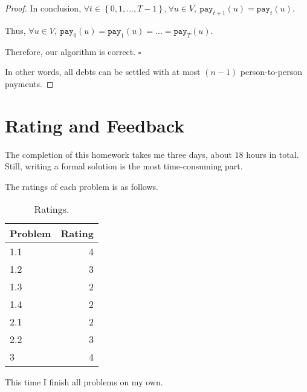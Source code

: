 \documentclass{article}
\newcommand{\whiteqed}{\hfill $\square$\par}
\newcommand{\set}[1]{\left\{#1\right\}}
\begin{document}
\begin{proof}
    \vspace{1em} \hspace{1.3em}
    In conclusion, $\forall t\in\set{0,1,...,T-1},\forall u\in V,\ \mathtt{pay}_{t+1}(u)=\mathtt{pay}_t(u).$
    
    \hspace{1.3em}
    Thus, $\forall u\in V,\ \mathtt{pay}_0(u)=\mathtt{pay}_1(u)=...=\mathtt{pay}_{T}(u)$.
    
    \hspace{1.3em}
    Therefore, our algorithm is correct. \whiteqed
    
    \vspace{1em} \hspace{1.3em}
    In other words, all debts can be settled with at most $(n-1)$ person-to-person payments.
\end{proof}

\vspace{3em}
\section{Rating and Feedback}
\vspace{1em} \hspace{1.2em}
The completion of this homework takes me three days, about $18$ hours in total. Still, writing a formal solution is the most time-consuming part.

The ratings of each problem is as follows.

\begin{table}[htbp]
    \centering
    \begin{tabular}{lr}
        \hline
        Problem & Rating \\
        \hline 
        1.1 & 4 \\
        1.2 & 3 \\
        1.3 & 2 \\
        1.4 & 2 \\
        \hline
        2.1 & 2 \\
        2.2 & 3 \\
        \hline
        3 & 4 \\
        \hline
\end{tabular}
\caption{Ratings.}
\end{table}

This time I finish all problems on my own.
\end{document}
